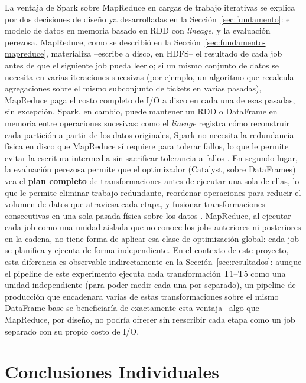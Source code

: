\documentclass[11pt,a4paper]{article}
\begin{document}
La ventaja de Spark sobre MapReduce en cargas de trabajo iterativas se
explica por dos decisiones de dise\~no ya desarrolladas en la
Secci\'on~\ref{sec:fundamento}: el modelo de datos en memoria basado en RDD
con \emph{lineage}, y la evaluaci\'on perezosa. MapReduce, como se describi\'o
en la Secci\'on~\ref{sec:fundamento-mapreduce}, materializa --escribe a
disco, en HDFS-- el resultado de cada job antes de que el siguiente job
pueda leerlo; si un mismo conjunto de datos se necesita en varias iteraciones
sucesivas (por ejemplo, un algoritmo que recalcula agregaciones sobre el
mismo subconjunto de tickets en varias pasadas), MapReduce paga el costo
completo de I/O a disco en cada una de esas pasadas, sin excepci\'on. Spark,
en cambio, puede mantener un RDD o DataFrame en memoria entre operaciones
sucesivas: como el \emph{lineage} registra c\'omo reconstruir cada
partici\'on a partir de los datos originales, Spark no necesita la
redundancia f\'isica en disco que MapReduce s\'i requiere para tolerar
fallos, lo que le permite evitar la escritura intermedia sin sacrificar
tolerancia a fallos \cite{zaharia2012}. En segundo lugar, la evaluaci\'on
perezosa permite que el optimizador (Catalyst, sobre DataFrames) vea el
\textbf{plan completo} de transformaciones antes de ejecutar una sola de
ellas, lo que le permite eliminar trabajo redundante, reordenar operaciones
para reducir el volumen de datos que atraviesa cada etapa, y fusionar
transformaciones consecutivas en una sola pasada f\'isica sobre los datos
\cite{zaharia2016}. MapReduce, al ejecutar cada job como una unidad aislada
que no conoce los jobs anteriores ni posteriores en la cadena, no tiene
forma de aplicar esa clase de optimizaci\'on global: cada job se planifica y
ejecuta de forma independiente. En el contexto de este proyecto, esta
diferencia es observable indirectamente en la Secci\'on~\ref{sec:resultados}:
aunque el pipeline de este experimento ejecuta cada transformaci\'on T1--T5
como una unidad independiente (para poder medir cada una por separado), un
pipeline de producci\'on que encadenara varias de estas transformaciones
sobre el mismo DataFrame base se beneficiar\'ia de exactamente esta ventaja
--algo que MapReduce, por dise\~no, no podr\'ia ofrecer sin reescribir cada
etapa como un job separado con su propio costo de I/O.


\section{Conclusiones Individuales}
\label{sec:conclusiones}
\end{document}
